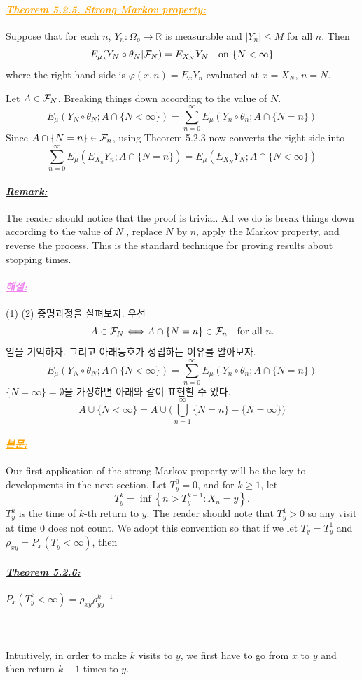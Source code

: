 \documentclass[12pt,oneside,english,a4paper]{article}
\def\bk{\paragraph{\LARGE$$}\LARGE}
\newcommand{\para}[1]{\paragraph{\LARGE\it\underline{\textbf{#1:}}}\LARGE}
\newcommand{\paraviolet}[1]{\paragraph{\LARGE\textcolor{violet}{\it\underline{\textbf{#1:}}}}\LARGE}
\newcommand{\paraorange}[1]{\paragraph{\LARGE\textcolor{orange}{\it\underline{\textbf{#1:}}}}\LARGE}
\begin{document}
\paraorange{Theorem 5.2.5. Strong Markov property} 
Suppose that for each $n$, $Y_n : \Omega_o \to \mathbb{R}$ is measurable and $|Y_n|\leq M$ for all $n$. Then
\[
E_{\mu}(Y_N\circ\theta_N|{\cal F}_N)=E_{X_N}Y_N \quad \mbox{on}~ \{N<\infty\} 
\]
where the right-hand side is $\varphi(x,n) = E_xY_n$ evaluated at $x = X_N$, $n = N$.

\proof Let $A \in {\cal F}_N$. Breaking things down according to the value of $N$. 
\[
E_{\mu}(Y_N\circ \theta_N ; A \cap \{N<\infty\})=\sum_{n=0}^{\infty}E_{\mu}(Y_n\circ \theta_n; A\cap \{N=n\})
\]
Since $A\cap \{N=n\} \in {\cal F}_n$, using Theorem 5.2.3 now converts the right side into 
\[
\sum_{n=0}^{\infty}E_{\mu}(E_{X_n}Y_n; A\cap \{N=n\})=E_{\mu}(E_{X_N}Y_N; A\cap \{N<\infty\})
\]

\para{Remark} The reader should notice that the proof is trivial. All we do is break things down according to the value of $N$ , replace $N$ by $n$, apply the Markov property, and reverse the process. This is the standard technique for proving results about stopping times. 

\paraviolet{해설} (1) (2) 증명과정을 살펴보자. 우선 
\[
A \in {\cal F}_N \Longleftrightarrow A \cap \{N=n\} \in {\cal F}_n \quad \mbox{for all $n$.}
\]
임을 기억하자. 그리고 아래등호가 성립하는 이유를 알아보자. 
\[
E_{\mu}(Y_N\circ \theta_N ; A \cap \{N<\infty\})=\sum_{n=0}^{\infty}E_{\mu}(Y_n\circ \theta_n; A\cap \{N=n\})
\]
$\{N=\infty\}=\emptyset$을 가정하면 아래와 같이 표현할 수 있다. 
\[
A\cup\{N<\infty\}=A\cup\big(\bigcup_{n=1}^{\infty}\{N=n\}-\{N=\infty\}\big)
\]


\paraorange{본문} Our first application of the strong Markov property will be the key to
developments in the next section. Let $T_y^0 = 0$, and for $k\geq 1$, let
\[
T_y^k=\inf \left\{n>T_y^{k-1}: X_n=y\right\}.
\]
$T_y^k$ is the time of $k$-th return to $y$. The reader should note that $T_y^1>0$ so any visit at time $0$ does not count. We adopt this convention so that if we let $T_y=T_y^1$ and $\rho_{xy}=P_x(T_y<\infty)$, then 

\para{Theorem 5.2.6}
$P_x(T_y^k<\infty)=\rho_{xy}\rho_{yy}^{k-1}$

\bk Intuitively, in order to make $k$ visits to $y$, we first have to go 
from $x$ to $y$ and then return $k-1$ times to $y$. 
\end{document}
